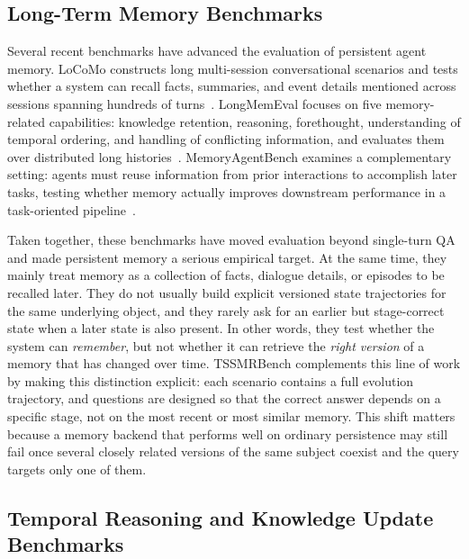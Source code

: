 \subsection{Long-Term Memory Benchmarks}

Several recent benchmarks have advanced the evaluation of persistent agent memory. LoCoMo constructs long multi-session conversational scenarios and tests whether a system can recall facts, summaries, and event details mentioned across sessions spanning hundreds of turns~\cite{locomo2024}. LongMemEval focuses on five memory-related capabilities: knowledge retention, reasoning, forethought, understanding of temporal ordering, and handling of conflicting information, and evaluates them over distributed long histories~\cite{longmemeval2024}. MemoryAgentBench examines a complementary setting: agents must reuse information from prior interactions to accomplish later tasks, testing whether memory actually improves downstream performance in a task-oriented pipeline~\cite{memoryagentbench2025}.

Taken together, these benchmarks have moved evaluation beyond single-turn QA and made persistent memory a serious empirical target. At the same time, they mainly treat memory as a collection of facts, dialogue details, or episodes to be recalled later. They do not usually build explicit versioned state trajectories for the same underlying object, and they rarely ask for an earlier but stage-correct state when a later state is also present. In other words, they test whether the system can \emph{remember}, but not whether it can retrieve the \emph{right version} of a memory that has changed over time. TSSMRBench complements this line of work by making this distinction explicit: each scenario contains a full evolution trajectory, and questions are designed so that the correct answer depends on a specific stage, not on the most recent or most similar memory. This shift matters because a memory backend that performs well on ordinary persistence may still fail once several closely related versions of the same subject coexist and the query targets only one of them.

\subsection{Temporal Reasoning and Knowledge Update Benchmarks}


